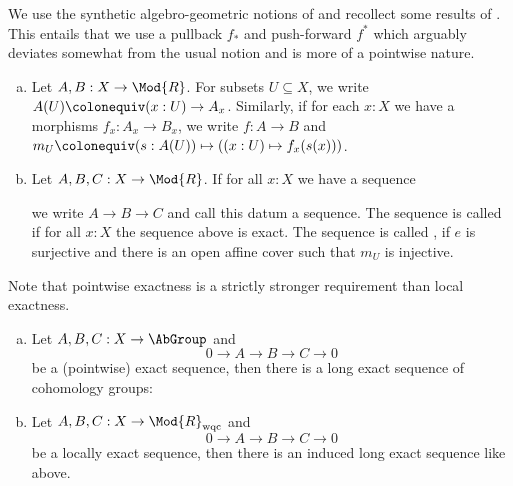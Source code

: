 We use the synthetic algebro-geometric notions of \cite{draft}
and recollect some results of \cite{cech-draft}.
This entails that we use a pullback $f_\ast$ and push-forward $f^\ast$ which arguably deviates somewhat from the usual notion and is more of a pointwise nature.

\begin{definition}
  \begin{enumerate}[(a)]
  \item Let $A,B:X\to \Mod{R}$.
    For subsets $U\subseteq X$, we write $A(U)\colonequiv (x:U)\to A_x$.
    Similarly, if for each $x:X$ we have a morphisms $f_x:A_x\to B_x$,
    we write $f:A\to B$ and $m_U\colonequiv (s:A(U))\mapsto ((x:U)\mapsto f_x(s(x)))$.
  \item Let $A,B,C:X\to \Mod{R}$.
    If for all $x:X$ we have a sequence
    \begin{center}
    \end{center}
    we write $A\to B\to C$ and call this datum a sequence.
    The sequence is called 
    if for all $x:X$ the sequence above is exact.
    The sequence is called ,
    if $e$ is surjective and there is an open affine cover such that $m_U$ is injective.
  \end{enumerate}
\end{definition}

Note that pointwise exactness is a strictly stronger requirement than local exactness.

\begin{theorem}
  \begin{enumerate}[(a)]
  \item Let $A,B,C:X\to \AbGroup$ and 
    \[
    0\to A\to B\to C\to 0
    \]
    be a (pointwise) exact sequence, then there is a long exact sequence of cohomology groups:
    \begin{center}
    \end{center}
  \item Let $A,B,C:X\to \Mod{R}_{\mathrm{wqc}}$ and
    \[
    0\to A\to B\to C\to 0
    \]
    be a locally exact sequence,
    then there is an induced long exact sequence like above.
  \end{enumerate}
\end{theorem}

